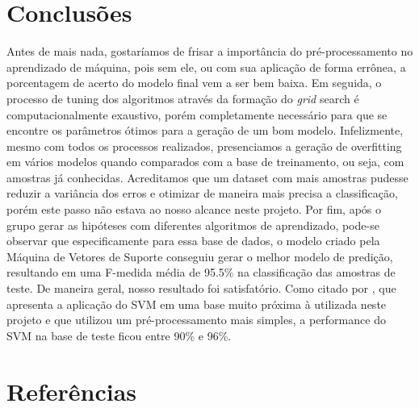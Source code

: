 \documentclass[10pt, conference, compsocconf]{IEEEtran}
\begin{document}
\section{Conclusões}\label{sec:conclusao}
Antes de mais nada, gostaríamos de frisar a importância do pré-processamento no aprendizado de máquina, pois sem ele, ou com sua aplicação de forma errônea, a porcentagem de acerto do modelo final vem a ser bem baixa.
    Em seguida, o processo de tuning dos algoritmos através da formação do \textit{grid} search é computacionalmente exaustivo, porém completamente necessário para que se encontre os parâmetros ótimos para a geração de um bom modelo. Infelizmente, mesmo com todos os processos realizados, presenciamos a geração de overfitting em vários modelos quando comparados com a base de treinamento, ou seja, com amostras já conhecidas. Acreditamos que um dataset com mais amostras pudesse reduzir a variância dos erros e otimizar de maneira mais precisa a classificação, porém este passo não estava ao nosso alcance neste projeto.
    Por fim, após o grupo gerar as hipóteses com diferentes algoritmos de
aprendizado, pode-se observar que especificamente para essa base de dados, o
modelo criado pela Máquina de Vetores de Suporte conseguiu gerar o melhor modelo
de predição, resultando em uma F-medida média de 95.5\% na classificação das
amostras de teste. De maneira geral, nosso resultado foi satisfatório. Como
citado por \cite{guia_svm}, que apresenta a aplicação do SVM em uma base muito próxima à utilizada neste projeto e que utilizou um pré-processamento mais simples, a performance do SVM na base de teste ficou entre 90\% e 96\%.

\section{Referências}
\printbibliography

%
%
%

%
%
\end{document}
